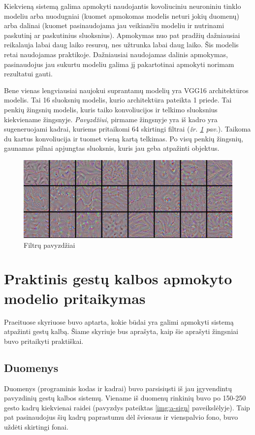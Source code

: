 \documentclass{VUMIFInfKursinis}
\begin{document}
Kiekvieną sistemą galima apmokyti naudojantis kovoliuciniu neuroniniu tinklo modeliu arba nuodugniai (kuomet apmokomas modelis neturi jokių duomenų) arba dalinai (kuomet pasinaudojama jau veikiančiu modeliu ir nutrinami paskutinį ar paskutinius sluoksnius). Apmokymas nuo pat pradžių dažniausiai reikalauja labai daug laiko resursų, nes užtrunka labai daug laiko. Šis modelis retai naudojamas praktikoje. Dažniausiai naudojamas dalinis apmokymas, pasinaudojus jau sukurtu modeliu galima jį pakartotinai apmokyti norimam rezultatui gauti. 

Bene vienas lengviausiai naujokui suprantamų modelių yra VGG16 architektūros modelis. Tai 16 sluoksnių modelis, kurio architektūra pateikta 1 priede. Tai penkių žingsnių modelis, kuris taiko konvoliucijos ir telkimo sluoksnius kiekviename žingsnyje. \textit{Pavyzdžiui}, pirmame žingsnyje yra iš kadro yra sugeneruojami kadrai, kuriems pritaikomi 64 skirtingi filtrai (\textit{žr. \ref{img:filtersvgg} pav.}). Taikoma du kartus konvoliucija ir tuomet vieną kartą telkimas. Po visų penkių žingsnių, gaunamas pilnai apjungtas sluoksnis, kuris jau geba atpažinti objektus. 

\begin{figure}[H]
	\centering
	\includegraphics[width=.8\linewidth]{img/vgg16filters}
	\caption[]{Filtrų pavyzdžiai\footnotemark}
	\label{img:filtersvgg}
\end{figure}

\section{Praktinis gestų kalbos apmokyto modelio pritaikymas}

Praeituose skyriuose buvo aptarta, kokie būdai yra galimi apmokyti sistemą atpažinti gestų kalbą. Šiame skyriuje bus aprašyta, kaip šie aprašyti žingsniai buvo pritaikyti praktiškai.

\subsection{Duomenys}
Duomenys (programinis kodas ir kadrai) buvo parsisiųsti iš jau įgyvendintų pavyzdinių gestų kalbos sistemų. Viename iš duomenų rinkinių buvo po 150-250 gesto kadrų kiekvienai raidei (pavyzdys pateiktas \ref{img:a-sign} paveikslėlyje). Taip pat pasinaudojus šių kadrų paprastumu dėl šviesaus ir vienspalvio fono, buvo uždėti skirtingi fonai.
\end{document}
